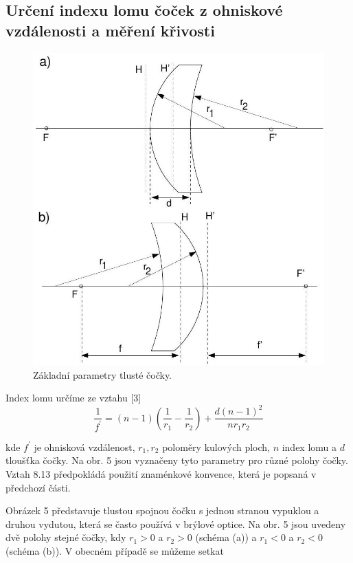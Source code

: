 \documentclass[czech,11pt,a4paper]{article}
\begin{document}
\begin{multicols}{2}
\section*{Určení indexu lomu čoček z ohniskové vzdálenosti a měření křivosti}
\begin{figure}[H]
	\includegraphics[width = 0.95\linewidth, center]{2024_12_03_2b013636ff75d184213cg-5}
	\caption{Základní parametry tlusté čočky.}
\end{figure}


Index lomu určíme ze vztahu [3]
\begin{equation}
	\frac{1}{f^{\prime}}=(n-1)\left(\frac{1}{r_{1}}-\frac{1}{r_{2}}\right)+\frac{d(n-1)^{2}}{n r_{1} r_{2}}
\end{equation}

kde $f^{\prime}$ je ohnisková vzdálenost, $r_{1}, r_{2}$ poloměry kulových ploch, $n$ index lomu a $d$ tloušťka čočky. Na obr. 5 jsou vyznačeny tyto parametry pro různé polohy čočky. Vztah 8.13 předpokládá použití znaménkové konvence, která je popsaná v předchozí části.

Obrázek 5 představuje tlustou spojnou čočku s jednou stranou vypuklou a druhou vydutou, která se často používá v brýlové optice. Na obr. 5 jsou uvedeny dvě polohy stejné čočky, kdy $r_{1}>0$ a $r_{2}>0$ (schéma (a)) a $r_{1}<0$ a $r_{2}<0$ (schéma (b)). V obecném případě se můžeme setkat



\end{multicols}
\end{document}
